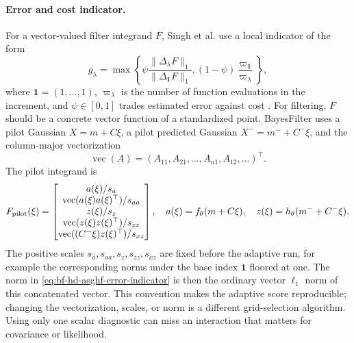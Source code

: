 \paragraph{Error and cost indicator.}
For a vector-valued filter integrand \(F\), Singh et al. use a local indicator
of the form
\begin{equation}
  g_\lambda
  =
  \max\left\{
    \psi\frac{\|\Delta_\lambda F\|_1}{\|\Delta_{\mathbf 1}F\|_1},
    (1-\psi)\frac{\varpi_{\mathbf 1}}{\varpi_\lambda}
  \right\},
  \label{eq:bf-hd-asghf-error-indicator}
\end{equation}
where \(\mathbf 1=(1,\ldots,1)\), \(\varpi_\lambda\) is the number of function
evaluations in the increment, and \(\psi\in[0,1]\) trades estimated error
against cost \citep[Section 3]{singh2018adaptive}.  For filtering, \(F\) should
be a concrete vector function of a standardized point.  BayesFilter uses a
pilot Gaussian \(X=m+C\xi\), a pilot predicted Gaussian
\(X^-=m^-+C^-\xi\), and the column-major vectorization
\[
  \operatorname{vec}(A)=(A_{11},A_{21},\ldots,A_{n1},A_{12},\ldots)^\top .
\]
The pilot integrand is
\begin{equation}
  F_{\rm pilot}(\xi)
  =
  \begin{bmatrix}
    a(\xi)/s_a\\
    \operatorname{vec}(a(\xi)a(\xi)^\top)/s_{aa}\\
    z(\xi)/s_z\\
    \operatorname{vec}(z(\xi)z(\xi)^\top)/s_{zz}\\
    \operatorname{vec}((C^-\xi)z(\xi)^\top)/s_{xz}
  \end{bmatrix},
  \quad
  a(\xi)=f_\theta(m+C\xi),\quad
  z(\xi)=h_\theta(m^-+C^-\xi).
  \label{eq:bf-hd-asghf-pilot-integrand}
\end{equation}
The positive scales \(s_a,s_{aa},s_z,s_{zz},s_{xz}\) are fixed before the
adaptive run, for example the corresponding norms under the base index
\(\mathbf 1\) floored at one.  The norm in
\eqref{eq:bf-hd-asghf-error-indicator} is then the ordinary vector
\(\ell_1\) norm of this concatenated vector.  This convention makes the
adaptive score reproducible; changing the vectorization, scales, or norm is a
different grid-selection algorithm.  Using only one scalar diagnostic can miss
an interaction that matters for covariance or likelihood.

